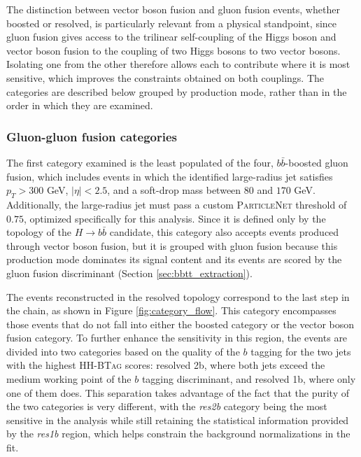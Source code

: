 %
The distinction between vector boson fusion and gluon fusion events, whether boosted or resolved, is particularly relevant from a physical standpoint, since gluon fusion gives access to the trilinear self-coupling of the Higgs boson and vector boson fusion to the coupling of two Higgs bosons to two vector bosons. Isolating one from the other therefore allows each to contribute where it is most sensitive, which improves the constraints obtained on both couplings. The categories are described below grouped by production mode, rather than in the order in which they are examined.

\subsubsection{Gluon-gluon fusion categories}
%
The first category examined is the least populated of the four, $b\bar{b}$-boosted gluon fusion, which includes events in which the identified large-radius jet satisfies $p_T > 300$ GeV, $|\eta| < 2.5$, and a soft-drop mass between $80$ and $170$ GeV. Additionally, the large-radius jet must pass a custom \textsc{ParticleNet} threshold of $0.75$, optimized specifically for this analysis. Since it is defined only by the topology of the $H\to b\bar{b}$ candidate, this category also accepts events produced through vector boson fusion, but it is grouped with gluon fusion because this production mode dominates its signal content and its events are scored by the gluon fusion discriminant (Section \ref{sec:bbtt_extraction}).




The events reconstructed in the resolved topology correspond to the last step in the chain, as shown in Figure \ref{fig:category_flow}. This category encompasses those events that do not fall into either the boosted category or the vector boson fusion category. To further enhance the sensitivity in this region, the events are divided into two categories based on the quality of the $b$ tagging for the two jets with the highest \textsc{HH-BTag} scores: resolved 2b, where both jets exceed the medium working point of the $b$ tagging discriminant, and resolved 1b, where only one of them does. This separation takes advantage of the fact that the purity of the two categories is very different, with the \textit{res2b} category being the most sensitive in the analysis while still retaining the statistical information provided by the \textit{res1b} region, which helps constrain the background normalizations in the fit.

